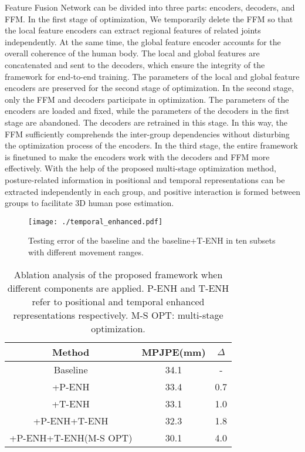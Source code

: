\documentclass[sigconf]{acmart}
\begin{document}
Feature Fusion Network can be divided into three parts: encoders, decoders, and FFM. In the first stage of optimization, We temporarily delete the FFM so that the local feature encoders can extract regional features of related joints independently. At the same time, the global feature encoder accounts for the overall coherence of the human body. The local and global features are concatenated and sent to the decoders, which ensure the integrity of the framework for end-to-end training. The parameters of the local and global feature encoders are preserved for the second stage of optimization. In the second stage, only the FFM and decoders participate in optimization. The parameters of the encoders are loaded and fixed, while the parameters of the decoders in the first stage are abandoned. The decoders are retrained in this stage. In this way, the FFM sufficiently comprehends the inter-group dependencies without disturbing the optimization process of the encoders. In the third stage, the entire framework is finetuned to make the encoders work with the decoders and FFM more effectively. With the help of the proposed multi-stage optimization method, posture-related information in positional and temporal representations can be extracted independently in each group, and positive interaction is formed between groups to facilitate 3D human pose estimation.


\begin{figure}
  \centering
  \texttt{[image: ./temporal\_enhanced.pdf]}
  \vspace{-0.5cm}
  \caption{Testing error of the baseline and the baseline+T-ENH in ten subsets with different movement ranges.}
  \label{img7}
\end{figure}



\begin{table}
  \centering
  \caption{Ablation analysis of the proposed framework when different components are applied. P-ENH and T-ENH refer to positional and temporal enhanced representations respectively. M-S OPT: multi-stage optimization.}
\begin{tabular}{ccc}
    \toprule
    Method & MPJPE(mm)  & $\Delta$ \\
    \midrule
    Baseline & 34.1&-  \\
    +P-ENH & 33.4&0.7  \\
    +T-ENH & 33.1&1.0  \\
    +P-ENH+T-ENH &32.3&1.8 \\
    +P-ENH+T-ENH(M-S OPT)&30.1 & 4.0\\
    \bottomrule
    \end{tabular}
  \label{tab4}
  \vspace{-0.3cm}
\end{table}
\end{document}
